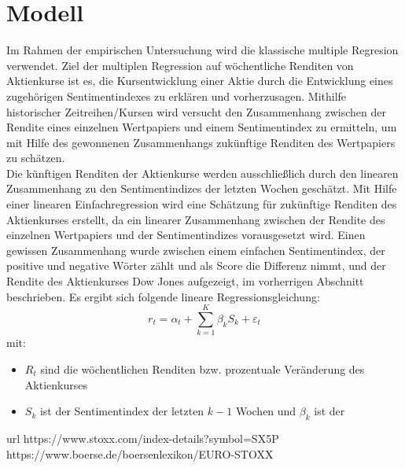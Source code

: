 \section{Modell} 
Im Rahmen der empirischen Untersuchung wird die klassische multiple Regresion verwendet. Ziel der multiplen Regression auf wöchentliche Renditen von Aktienkurse ist es, die Kursentwicklung einer Aktie durch die Entwicklung eines zugehörigen Sentimentindexes zu erklären und vorherzusagen. Mithilfe historischer Zeitreihen/Kursen wird versucht den Zusammenhang zwischen der Rendite eines einzelnen Wertpapiers und einem Sentimentindex zu ermitteln, um mit Hilfe des gewonnenen Zusammenhangs zukünftige Renditen des Wertpapiers zu schätzen. \\

Die künftigen Renditen der Aktienkurse werden ausschließlich
durch den linearen Zusammenhang zu den Sentimentindizes der letzten Wochen geschätzt. Mit Hilfe einer linearen Einfachregression wird eine Schätzung für zukünftige Renditen des Aktienkurses erstellt, da ein linearer Zusammenhang zwischen der Rendite des einzelnen Wertpapiers und der Sentimentindizes vorausgesetzt wird. Einen gewissen Zusammenhang wurde zwischen einem einfachen Sentimentindex, der positive und negative Wörter zählt und als Score die Differenz nimmt, und der Rendite des Aktienkurses  Dow Jones aufgezeigt, im  vorherrigen Abschnitt beschrieben. Es ergibt sich folgende lineare Regressionsgleichung:
\begin{equation}
r_{t}=\alpha_{t}+ \sum_{k=1}^{K} \beta_{k} S_{k}+\varepsilon_{t}
\end{equation}
mit:
\begin{itemize}
	\item  $R_{t}$ sind die wöchentlichen Renditen bzw. prozentuale Veränderung des Aktienkurses
	\item $S_{k}$ ist der Sentimentindex der letzten $k-1$ Wochen und $\beta_{k}$ ist der 
\end{itemize}



url https://www.stoxx.com/index-details?symbol=SX5P
https://www.boerse.de/boersenlexikon/EURO-STOXX
